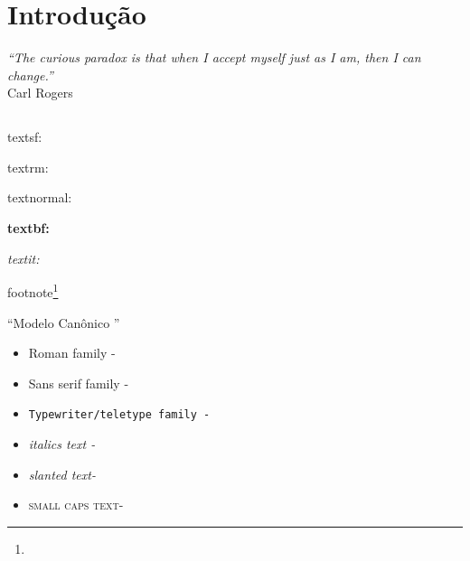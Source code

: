 


\chapter[Introdução]{Introdução \showfont}
\begin{flushright}
	\textit{``The curious paradox is that when I accept myself just as I am, then I can change.''}\\
	Carl Rogers
\end{flushright}


\newpage


\section[Some encoding tests]{\showfont}
\subsection{\showfont}
\subsubsection{\showfont}
\subsubsubsection{\showfont}


\textsf{textsf: \showfont} 

\textrm{textrm: \showfont}

\textnormal{textnormal: \showfont}

\textbf{textbf: \showfont} 

\textit{textit: \showfont}

footnote\footnote{\showfont}


``Modelo Canônico \showfont''

\begin{itemize}
	\item \textrm{Roman family - \showfont }
	\item \textsf{Sans serif family - \showfont}
	\item \texttt{Typewriter/teletype family - \showfont}
	\item \textit{italics text - \showfont}
	\item \textsl{slanted text- \showfont}
	\item \textsc{small caps text- \showfont}	
\end{itemize}




